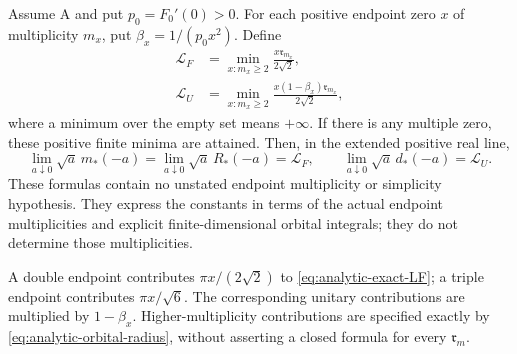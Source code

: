 \begin{theorem}
\label{thm:analytic-exact-orbital-detection}
Assume A and put $p_0=F_0'(0)>0$. For each positive endpoint zero
$x$ of multiplicity $m_x$, put $\beta_x=1/(p_0x^2)$. Define
\begin{align}
 \mathcal L_F&=\min_{x:m_x\ge2}
                       \frac{x\mathfrak r_{m_x}}{2\sqrt2},
                          \label{eq:analytic-exact-LF}\\
 \mathcal L_U&=\min_{x:m_x\ge2}
                       \frac{x(1-\beta_x)\mathfrak r_{m_x}}{2\sqrt2},
                          \label{eq:analytic-exact-LU}
\end{align}
where a minimum over the empty set means $+\infty$. If there is any
multiple zero, these positive finite minima are attained. Then, in
the extended positive real line,
\begin{equation}\label{eq:analytic-exact-orbital-limits}
 \lim_{a\downarrow0}\sqrt a\,m_*(-a)
 =\lim_{a\downarrow0}\sqrt a\,R_*(-a)=\mathcal L_F,
       \qquad
 \lim_{a\downarrow0}\sqrt a\,d_*(-a)=\mathcal L_U.
\end{equation}
These formulas contain no unstated endpoint multiplicity or simplicity
hypothesis. They express the constants in terms of the actual endpoint
multiplicities and explicit finite-dimensional orbital integrals;
they do not determine those multiplicities.

A double endpoint contributes $\pi x/(2\sqrt2)$ to
\eqref{eq:analytic-exact-LF}; a triple endpoint contributes
$\pi x/\sqrt6$. The corresponding unitary contributions are
multiplied by $1-\beta_x$. Higher-multiplicity contributions are
specified exactly by \eqref{eq:analytic-orbital-radius}, without
asserting a closed formula for every $\mathfrak r_m$.
\end{theorem}

